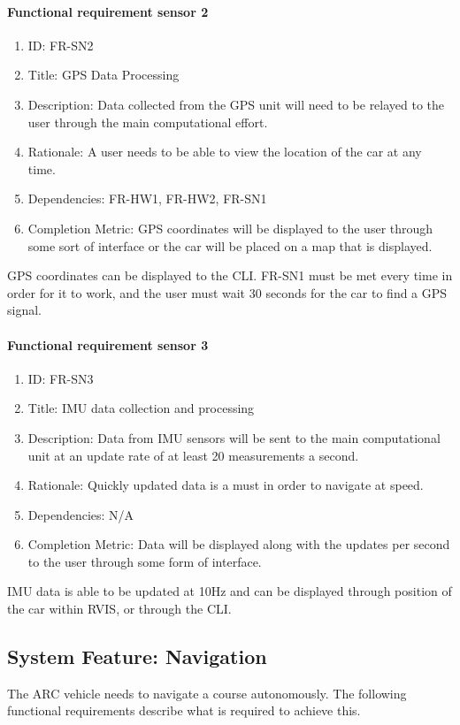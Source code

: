 \documentclass[compsoc,draftclsnofoot,onecolumn,10pt]{IEEEtran}
\begin{document}
	\paragraph{\textbf{Functional requirement sensor 2}}
    		\begin{enumerate}
    			\item ID: FR-SN2
    			\item Title: GPS Data Processing
    			\item Description: Data collected from the GPS unit will need to be relayed to the user through the main computational effort. 
    			\item Rationale: A user needs to be able to view the location of the car at any time. 
    			\item Dependencies: FR-HW1, FR-HW2, FR-SN1
			\item Completion Metric: GPS coordinates will be displayed to the user through some sort of interface or the car will be placed on a map that is displayed. 
    		\end{enumerate}
	GPS coordinates can be displayed to the CLI. FR-SN1 must be met every time in order for it to work, and the user must wait 30 seconds for the car to find a GPS signal. 
	
	\paragraph{\textbf{Functional requirement sensor 3}}
    		\begin{enumerate}
    			\item ID: FR-SN3
    			\item Title: IMU data collection and processing
    			\item Description: Data from IMU sensors will be sent to the main computational unit at an update rate of at least 20 measurements a second. 
    			\item Rationale: Quickly updated data is a must in order to navigate at speed.
    			\item Dependencies: N/A
			\item Completion Metric: Data will be displayed along with the updates per second to the user through some form of interface.
    		\end{enumerate}
    IMU data is able to be updated at 10Hz and can be displayed through position of the car within RVIS, or through the CLI. 
    
\subsection{System Feature: Navigation}
The ARC vehicle needs to navigate a course autonomously. The following functional
requirements describe what is required to achieve this.\par
\end{document}

